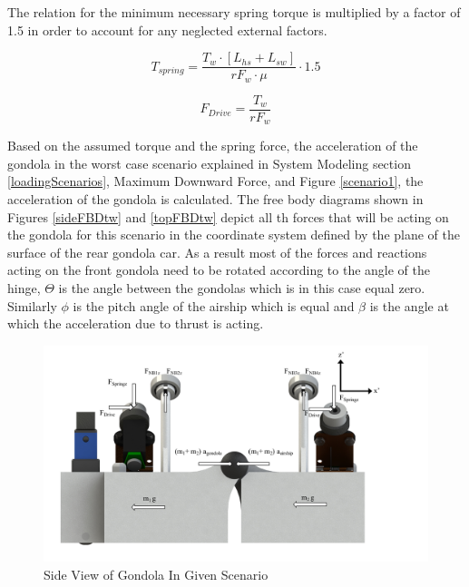 \documentclass[../main.tex]{subfiles}
\begin{document}
The relation for the minimum necessary spring torque is multiplied by a factor of 1.5 in order to account for any neglected external factors.

\begin{equation}
\label{eqn:springTorque}
T_{spring} = \frac{T_w\cdot{}[L_{hs}+L_{sw}]}{r{F_w}\cdot{}\mu}\cdot{}1.5
\end{equation}

\begin{equation}
\label{eqn:driveForce}
F_{Drive} = \frac{T_w}{r{F_w}}
\end{equation}

Based on the assumed torque and the spring force, the acceleration of the gondola in the worst case scenario explained in System Modeling section \ref{loadingScenarios}, Maximum Downward Force, and Figure \ref{scenario1}, the acceleration of the gondola is calculated. The free body diagrams shown in Figures \ref{sideFBDtw} and \ref{topFBDtw} depict all th forces that will be acting on the gondola for this scenario in the coordinate system defined by the plane of the surface of the rear gondola car. As a result most of the forces and reactions acting on the front gondola need to be rotated according to the angle of the hinge, $\Theta$ is the angle between the gondolas which is in this case equal zero. Similarly $\phi$ is the pitch angle of the airship which is equal  and $\beta$ is the angle at which the acceleration due to thrust is acting. 
\begin{figure}[H]
	\centering
	\includegraphics[width=1.1\linewidth]{img/gondola/gondolaSideTW.pdf}
	\caption{Side View of Gondola In Given Scenario}
	\label{fig:gondolaSideTW}
\end{figure}
\end{document}
